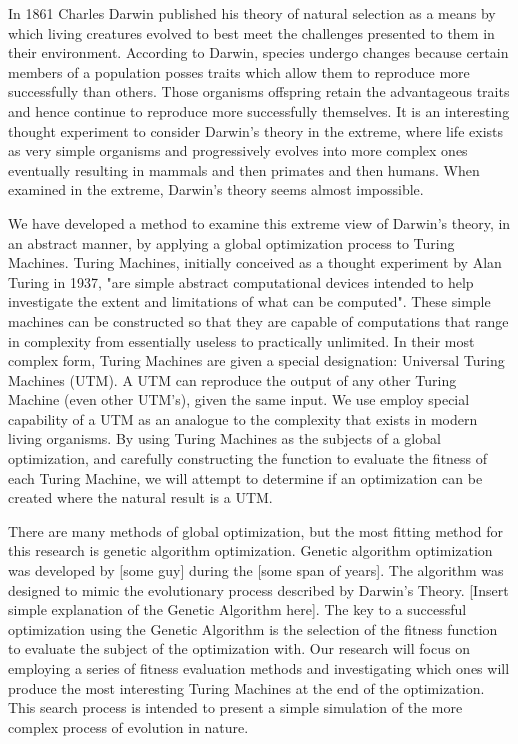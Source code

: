 In 1861 Charles Darwin published his theory of natural selection as a means by which living creatures evolved to best meet the challenges presented to them in their environment. \cite{Origin_of_species} According to Darwin, species undergo changes because certain members of a population posses traits which allow them to reproduce more successfully than others. Those organisms offspring retain the advantageous traits and hence continue to reproduce more successfully themselves. It is an interesting thought experiment to consider Darwin's theory in the extreme, where life exists as very simple organisms and progressively evolves into more complex ones eventually resulting in mammals and then primates and then humans. When examined in the extreme, Darwin's theory seems almost impossible. 

We have developed a method to examine this extreme view of Darwin's theory, in an abstract manner, by applying a global optimization process to Turing Machines. Turing Machines, initially conceived as a thought experiment by Alan Turing in 1937, "are simple abstract computational devices intended to help investigate the extent and limitations of what can be computed". \cite{SEP_turing} These simple machines can be constructed so that they are capable of computations that range in complexity from essentially useless to practically unlimited. In their most complex form, Turing Machines are given a special designation: Universal Turing Machines (UTM). A UTM can reproduce the output of any other Turing Machine (even other UTM's), given the same input. We use employ special capability of a UTM as an analogue to the complexity that exists in modern living organisms. By using Turing Machines as the subjects of a global optimization, and carefully constructing the function to evaluate the fitness of each Turing Machine, we will attempt to determine if an optimization can be created where the natural result is a UTM. 

There are many methods of global optimization, but the most fitting method for this research is genetic algorithm optimization. Genetic algorithm optimization was developed by [some guy] during the [some span of years]. The algorithm was designed to mimic the evolutionary process described by Darwin's Theory. [Insert simple explanation of the Genetic Algorithm here]. The key to a successful optimization using the Genetic Algorithm is the selection of the fitness function to evaluate the subject of the optimization with. Our research will focus on employing a series of fitness evaluation methods and investigating which ones will produce the most interesting Turing Machines at the end of the optimization. This search process is intended to present a simple simulation of the more complex process of evolution in nature.

